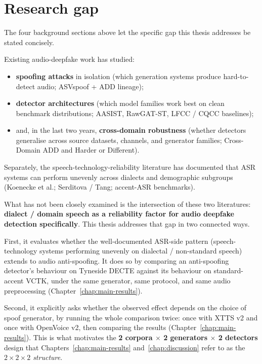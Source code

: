 \section{Research gap}
\label{sec:background-research-gap}

The four background sections above let the specific gap this
thesis addresses be stated concisely.

Existing audio-deepfake work has studied:

\begin{itemize}
    \item \textbf{spoofing attacks} in isolation (which generation systems
        produce hard-to-detect audio; ASVspoof + ADD lineage);
    \item \textbf{detector architectures} (which model families work best on
        clean benchmark distributions; AASIST, RawGAT-ST, LFCC / CQCC
        baselines);
    \item and, in the last two years, \textbf{cross-domain robustness}
        (whether detectors generalise across source datasets,
        channels, and generator families; Cross-Domain ADD and Harder
        or Different).
\end{itemize}

Separately, the speech-technology-reliability literature has
documented that ASR systems can perform unevenly across dialects
and demographic subgroups (Koenecke et al.; Serditova / Tang;
accent-ASR benchmarks).

What has not been closely examined is the intersection of these
two literatures: \textbf{dialect / domain speech as a reliability
factor for audio deepfake detection specifically}. This thesis
addresses that gap in two connected ways.

First, it evaluates whether the well-documented ASR-side pattern
(speech-technology systems performing unevenly on dialectal /
non-standard speech) extends to audio anti-spoofing. It does so
by comparing an anti-spoofing detector's behaviour on Tyneside
DECTE against its behaviour on standard-accent VCTK, under the
same generator, same protocol, and same audio preprocessing
(Chapter~\ref{chap:main-results}).

Second, it explicitly asks whether the observed effect depends on
the choice of spoof generator, by running the whole comparison
twice: once with XTTS v2 and once with OpenVoice v2, then
comparing the results (Chapter~\ref{chap:main-results}). This is
what motivates the \textbf{2 corpora $\times$ 2 generators
$\times$ 2 detectors} design that Chapters~\ref{chap:main-results}
and~\ref{chap:discussion} refer to as the \emph{$2 \times 2 \times 2$ structure}.

